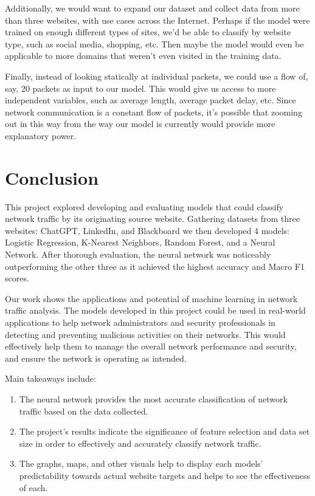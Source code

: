 \documentclass[10pt,sigconf,letterpaper,nonacm]{acmart}
\begin{document}
Additionally, we would want to expand our dataset and collect data from more than three websites, with use cases across the Internet. Perhaps if the model were trained on enough different types of sites, we'd be able to classify by website type, such as social media, shopping, etc. Then maybe the model would even be applicable to more domains that weren't even visited in the training data.

Finally, instead of looking statically at individual packets, we could use a flow of, say, 20 packets as input to our model. This would give us access to more independent variables, such as average length, average packet delay, etc. Since network communication is a constant flow of packets, it's possible that zooming out in this way from the way our model is currently would provide more explanatory power.

\section{Conclusion}
This project explored developing and evaluating models that could classify network traffic by its originating source website. Gathering datasets from three websites:
ChatGPT, LinkedIn, and Blackboard we then developed 4 models: Logistic Regression, K-Nearest Neighbors, Random Forest, and a Neural Network. After thorough evaluation, the neural network was noticeably outperforming the other three as it achieved the highest accuracy and Macro F1 scores.

Our work shows the applications and potential of machine learning in network traffic analysis. The models developed in this project could be used in real-world applications to help network administrators and security professionals in detecting and preventing malicious activities on their networks. 
This would effectively help them to manage the overall network performance and security, and ensure the network is operating as intended.

Main takeaways include:
\begin{enumerate}
  \item The neural network provides the most accurate classification of network traffic based on the data collected.
  \item The project's results indicate the significance of feature selection and data set size in order to effectively and accurately classify network traffic.
  \item The graphs, maps, and other visuals help to display each models' predictability towards actual website targets and helps to see the effectiveness of each. 
\end{enumerate}
\end{document}
